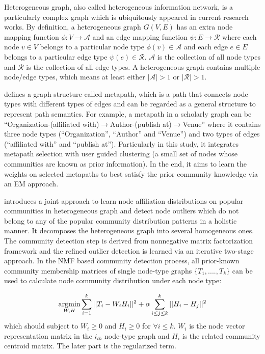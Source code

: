 Heterogeneous graph, also called heterogeneous information network, is a particularly complex graph which is ubiquitously appeared in current research works. By definition, a heterogeneous graph $G(V,E)$ has an extra node mapping function $\phi : V \rightarrow \mathcal{A}$ and an edge mapping function $\psi : E \rightarrow \mathcal{R} $ where each node $v \in V$ belongs to a particular node type $\phi(v) \in \mathcal{A}$ and each edge $e \in E$ belongs to a particular edge type $\psi(e) \in \mathcal{R}$. $\mathcal{A}$ is the collection of all node types and $\mathcal{R}$ is the collection of all edge types. A heterogeneous graph contains multiple node/edge types, which means at least either $|\mathcal{A}| > 1$ or $|\mathcal{R}| > 1$.

\cite{sun2013pathselclus} defines a graph structure called metapath, which is a path that connects node types with different types of edges and can be regarded as a general structure to represent path semantics. For example, a metapath in a scholarly graph can be ``Organization-(affiliated with)$\rightarrow$Author-(publish at)$\rightarrow$Venue'' where it contains three node types (``Organization'', ``Author'' and ``Venue'') and two types of edges (``affiliated with'' and ``publish at''). Particularly in this study, it integrates metapath selection with user guided clustering (a small set of nodes whose communities are known as prior information). In the end, it aims to learn the weights on selected metapaths to best satisfy the prior community knowledge via an EM approach.  

\cite{gupta2013community} introduces a joint approach to learn node affiliation distributions on popular communities in heterogeneous graph and detect node outliers which do not belong to any of the popular community distribution patterns in a holistic manner. It decomposes the heterogeneous graph into several homogeneous ones. The community detection step is derived from nonnegative matrix factorization framework and the refined outlier detection is learned via an iterative two-stage approach. In the NMF based community detection process, all prior-known community membership matrices of single node-type graphs $\{T_1,....,T_k\}$ can be used to calculate node community distribution under each node type:

\begin{equation}
	\operatorname*{argmin}_{W,H}\sum_{i=1}^{k}||T_i - W_{i}H_{i}||^2 + \alpha \sum_{i \leq j \leq k}^{k}||H_i - H_j||^2
\end{equation}
which should subject to $W_i \geq 0$ and $H_i \geq 0$ for $ \forall i \leq k$. $W_i$ is the node vector representation matrix in the $i_{th}$ node-type graph and $H_i$ is the related community centroid matrix. The later part is the regularized term.

